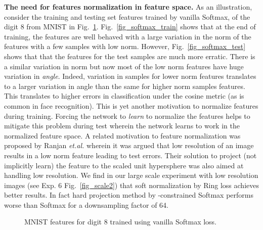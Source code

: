 \documentclass[10pt,twocolumn,letterpaper]{article}
\begin{document}
\textbf{ The need for features normalization in feature space.} As an illustration, consider the training and testing set features trained by vanilla Softmax, of the digit 8 from MNIST in Fig.~\ref{fig_train_test}. Fig.~\ref{fig_softmax_train} shows that at the end of training, the features are well behaved with a large variation in the norm of the features with a few samples with low norm. However, Fig.~\ref{fig_softmax_test} shows that that the features for the test samples are much more erratic. There is a similar variation in norm but now most of the low norm features have huge variation in \textit{angle}. Indeed, variation in samples for lower norm features translates to a larger variation in angle than the same for higher norm samples features. This translates to higher errors in classification under the cosine metric (as is common in face recognition). This is yet another motivation to normalize features during training. Forcing the network to \textit{learn} to normalize the features helps to mitigate this problem during test wherein the network learns to work in the normalized feature space. A related motivation to feature normalization was proposed by Ranjan \emph{et.al.} \cite{ranjan2017l2} wherein it was argued that low resolution of an image results in a low norm feature leading to test errors. Their solution to project (not implicitly learn) the feature to the scaled unit hypersphere was also aimed at handling low resolution. We find in our large scale experiment with low resolution images (see Exp. 6 Fig.~\ref{fig_scale2}) that soft normalization by Ring loss achieves better results. In fact hard projection method by -constrained Softmax \cite{ranjan2017l2} performs worse than Softmax for a downsampling factor of 64.








\begin{figure}\begin{center}
    \end{center}
    \vspace{-0.5cm}
\caption{MNIST features for digit 8 trained using vanilla Softmax loss. } 
\label{fig_train_test}
\vspace{-0.7cm}
\end{figure}
\end{document}
